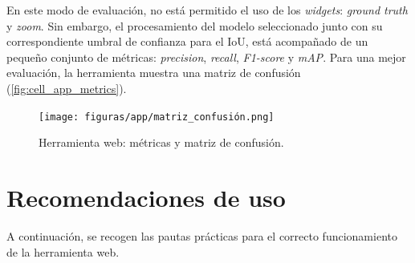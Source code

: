\documentclass[12pt,a4paper,onecolumn,oneside]{report}
\begin{document}
En este modo de evaluación, no está permitido el uso de los \textit{widgets}: \textit{ground truth} y \textit{zoom}. Sin embargo, 
el procesamiento del modelo seleccionado junto con su correspondiente umbral de confianza para el IoU, está acompañado de un pequeño conjunto de métricas:
\textit{precision}, \textit{recall}, \textit{F1-score} y \textit{mAP}. Para una mejor evaluación, la herramienta muestra una matriz de confusión (\autoref{fig:cell_app_metrics}).

\begin{figure}[htbp]
  \centering
  \texttt{[image: figuras/app/matriz\_confusión.png]}
  \caption{Herramienta web: métricas y matriz de confusión.}
  \label{fig:cell_app_metrics}
\end{figure}

\section{Recomendaciones de uso}
\label{sec:Recomendaciones de uso}

A continuación, se recogen las pautas prácticas para el correcto funcionamiento de la herramienta web.
\end{document}
